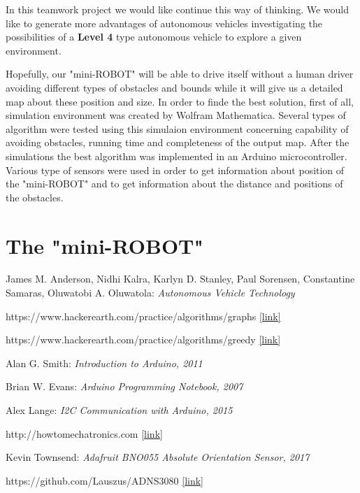 \documentclass[12pt,english]{article}
\begin{document}
In this teamwork project we would like continue this way of thinking. We would like to generate more advantages of autonomous vehicles investigating the possibilities of a \textbf{Level 4} type autonomous vehicle to explore a given environment. 

Hopefully, our "mini-ROBOT" will be able to drive itself without a human driver avoiding different types of obstacles and bounds while it will give us a detailed map about these position and size. In order to finde the best solution, first of all, simulation environment was created by Wolfram Mathematica. Several types of algorithm were tested using this simulaion environment concerning capability of avoiding obstacles, running time and completeness of the output map. After the simulations the best algorithm was implemented in an Arduino  microcontroller. Various type of sensors were used in order to get information about position of the "mini-ROBOT" and to get information about the distance and positions of the obstacles.



\newpage

\section{The "mini-ROBOT"}





\newpage
\begin{thebibliography}{1}


 James M. Anderson, Nidhi Kalra, Karlyn D. Stanley, Paul Sorensen, Constantine Samaras, Oluwatobi A. Oluwatola: \emph{Autonomous Vehicle Technology}


 https://www.hackerearth.com/practice/algorithms/graphs \href{https://www.hackerearth.com/practice/algorithms/graphs/depth-first-search/tutorial/}{[link]}


 https://www.hackerearth.com/practice/algorithms/greedy \href{https://www.hackerearth.com/practice/algorithms/greedy/basics-of-greedy-algorithms/tutorial/}{[link]}


 Alan G. Smith: \emph{Introduction to Arduino, 2011}


 Brian W. Evans: \emph{Arduino Programming Notebook, 2007}


 Alex Lange: \emph{I2C Communication with Arduino, 2015}

 http://howtomechatronics.com \href{http://howtomechatronics.com/}{[link]}

	 Kevin Townsend: \emph{Adafruit BNO055 Absolute Orientation Sensor, 2017}

	 https://github.com/Lauszus/ADNS3080 \href{https://github.com/Lauszus/ADNS3080}{[link]}
	
	



\end{thebibliography}
\end{document}
